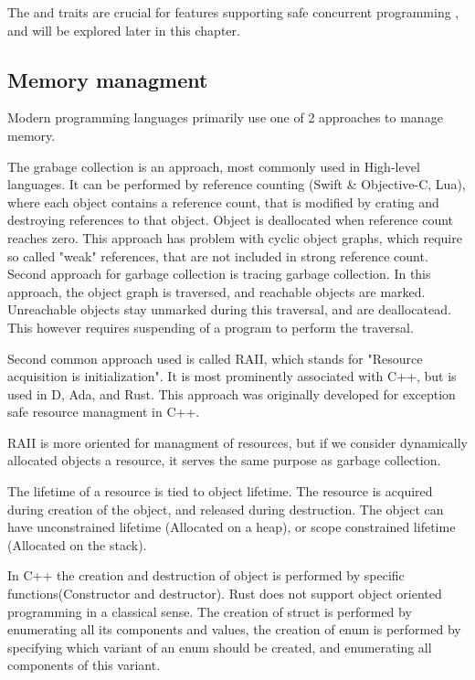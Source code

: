 The  and  traits are crucial for features supporting safe concurrent programming , and will be explored later in
this chapter.

\subsection{Memory managment}
Modern programming languages primarily use one of 2 approaches to manage memory.

The grabage collection is an approach, most commonly used in High-level languages. It can be performed
by reference counting (Swift \& Objective-C, Lua), where each object contains a reference count, that is modified
by crating and destroying references to that object. Object is deallocated when reference count reaches zero.
This approach has problem with cyclic object graphs, which require so called "weak" references, that are
not included in strong reference count. Second approach for garbage collection is tracing garbage collection.
In this approach, the object graph is traversed, and reachable objects are marked. Unreachable objects stay unmarked during
this traversal, and are deallocatead. This however requires suspending of a program to perform the traversal.

Second common approach used is called RAII, which stands for "Resource acquisition is initialization". It is most
prominently associated with C++, but is used in D, Ada, and Rust. This approach was originally developed for exception safe
resource managment in C++\cite{stroustrup2015brief}.

RAII is more oriented for managment of resources, but if we consider dynamically allocated objects a resource, it serves
the same purpose as garbage collection.

The lifetime of a resource is tied to object lifetime. The resource is acquired during creation of the object,
and released during destruction. The object can have unconstrained lifetime (Allocated on a heap), or scope constrained
lifetime (Allocated on the stack).

In C++ the creation and destruction of object is performed by specific functions(Constructor and destructor). Rust does
not support object oriented programming in a classical sense. The creation of struct is performed by enumerating all its
components and values, the creation of enum is performed by specifying which variant of an enum should be created, and enumerating
all components of this variant.


